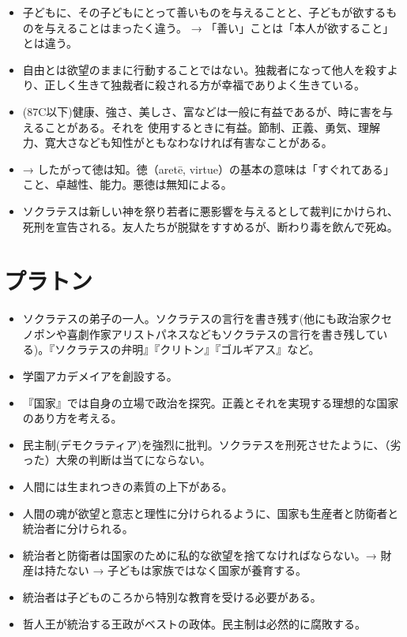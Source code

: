 \documentclass[uplatex,dvipdfmx]{jsarticle} \usepackage{mystyle}%
\begin{document}
\begin{itemize}
\item 子どもに、その子どもにとって善いものを与えることと、子どもが欲するものを与えることはまったく違う。 → 「善い」ことは「本人が欲すること」とは違う。

\item 自由とは欲望のままに行動することではない。独裁者になって他人を殺すより、正しく生きて独裁者に殺される方が幸福でありよく生きている。

\item (87C以下)健康、強さ、美しさ、富などは一般に有益であるが、時に害を与えることがある。それを 使用するときに有益。節制、正義、勇気、理解力、寛大さなども知性がともなわなければ有害なことがある。

\item   → したがって徳は知。徳（aret\={e}, virtue）の基本の意味は「すぐれてある」こと、卓越性、能力。悪徳は無知による。

\item ソクラテスは新しい神を祭り若者に悪影響を与えるとして裁判にかけられ、死刑を宣告される。友人たちが脱獄をすすめるが、断わり毒を飲んで死ぬ。

\end{itemize}

\section{プラトン}

\begin{itemize}
\item ソクラテスの弟子の一人。ソクラテスの言行を書き残す(他にも政治家クセノポンや喜劇作家アリストパネスなどもソクラテスの言行を書き残している)。『ソクラテスの弁明』『クリトン』『ゴルギアス』など。
\item 学園アカデメイアを創設する。
\item 『国家』では自身の立場で政治を探究。正義とそれを実現する理想的な国家のあり方を考える。
\item 民主制(デモクラティア)を強烈に批判。ソクラテスを刑死させたように、（劣った）大衆の判断は当てにならない。
\item 人間には生まれつきの素質の上下がある。
\item 人間の魂が欲望と意志と理性に分けられるように、国家も生産者と防衛者と統治者に分けられる。
\item 統治者と防衛者は国家のために私的な欲望を捨てなければならない。→ 財産は持たない → 子どもは家族ではなく国家が養育する。
\item 統治者は子どものころから特別な教育を受ける必要がある。
\item 哲人王が統治する王政がベストの政体。民主制は必然的に腐敗する。
\end{itemize}
\end{document}
